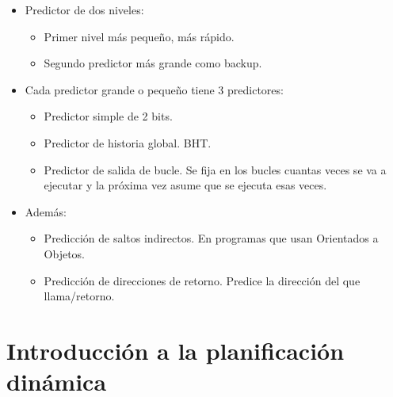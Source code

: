 \documentclass[12pt, twoside, openright]{report} %
\begin{document}
\begin{itemize}
\begin{itemize}
		      \item Predictor de dos niveles:

		            \begin{itemize}

			            \item Primer nivel más pequeño, más rápido.
			            \item Segundo predictor más grande como backup.
		            \end{itemize}
		      \item Cada predictor grande o pequeño tiene 3 predictores:

		            \begin{itemize}

			            \item Predictor simple de 2 bits.
			            \item Predictor de historia global. BHT.
			            \item Predictor de salida de bucle. Se fija en los bucles cuantas
			                  veces se va a ejecutar y la próxima vez asume que se ejecuta
			                  esas veces.
		            \end{itemize}
		      \item Además:
		            \begin{itemize}
			            \item Predicción de saltos indirectos. En programas que usan Orientados a
			                  Objetos.

			            \item Predicción de direcciones de retorno. Predice la dirección del
			                  que llama/retorno.
		            \end{itemize}
	      \end{itemize}
\end{itemize}
\section{Introducción a la planificación dinámica}
\end{document}
